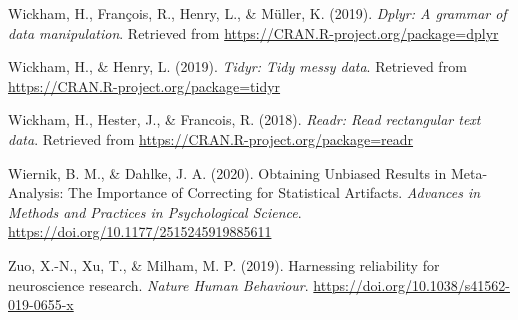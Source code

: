 \documentclass[
  man,floatsintext]{apa6}
\newlength{\cslhangindent}
\newlength{\cslentryspacingunit} %
\newenvironment{CSLReferences}[2] %
 {%
  \setlength{\parindent}{0pt}
  \ifodd #1
  \let\oldpar\par
  \def\par{\hangindent=\cslhangindent\oldpar}
  \fi
  \setlength{\parskip}{#2\cslentryspacingunit}
 }%
 {}
\begin{document}
\begin{CSLReferences}{1}{0}
\leavevmode{}%
Wickham, H., François, R., Henry, L., \& Müller, K. (2019). \emph{Dplyr: A grammar of data manipulation}. Retrieved from \url{https://CRAN.R-project.org/package=dplyr}

\leavevmode{}%
Wickham, H., \& Henry, L. (2019). \emph{Tidyr: Tidy messy data}. Retrieved from \url{https://CRAN.R-project.org/package=tidyr}

\leavevmode{}%
Wickham, H., Hester, J., \& Francois, R. (2018). \emph{Readr: Read rectangular text data}. Retrieved from \url{https://CRAN.R-project.org/package=readr}

\leavevmode{}%
Wiernik, B. M., \& Dahlke, J. A. (2020). Obtaining {Unbiased} {Results} in {Meta}-{Analysis}: {The} {Importance} of {Correcting} for {Statistical} {Artifacts}. \emph{Advances in Methods and Practices in Psychological Science}. \url{https://doi.org/10.1177/2515245919885611}

\leavevmode{}%
Zuo, X.-N., Xu, T., \& Milham, M. P. (2019). Harnessing reliability for neuroscience research. \emph{Nature Human Behaviour}. \url{https://doi.org/10.1038/s41562-019-0655-x}

\end{CSLReferences}

\endgroup
\end{document}
